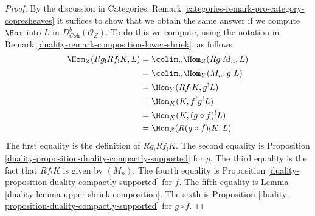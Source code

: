 \begin{proof}

By the discussion in
Categories, Remark \ref{categories-remark-pro-category-copresheaves}
it suffices to show that we obtain the same answer if we compute
$\Hom$ into $L$ in $D^b_{\textit{Coh}}(\mathcal{O}_Z)$. To do this
we compute, using the notation in
Remark \ref{duality-remark-composition-lower-shriek}, as follows
\begin{align*}
\Hom_Z(Rg_!Rf_!K, L)
& =
\colim_n \Hom_Z(Rg_!M_n, L) \\
& =
\colim_n \Hom_Y(M_n, g^!L) \\
& =
\Hom_Y(Rf_!K, g^!L) \\
& =
\Hom_X(K, f^!g^!L) \\
& =
\Hom_X(K, (g \circ f)^!L) \\
& =
\Hom_Z(R(g \circ f)_!K, L)
\end{align*}
The first equality is the definition of $Rg_!Rf_!K$. The second
equality is Proposition \ref{duality-proposition-duality-compactly-supported}
for $g$.
The third equality is the fact that $Rf_!K$ is given by $(M_n)$.
The fourth equality is
Proposition \ref{duality-proposition-duality-compactly-supported} for $f$.
The fifth equality is Lemma \ref{duality-lemma-upper-shriek-composition}.
The sixth is
Proposition \ref{duality-proposition-duality-compactly-supported} for $g \circ f$.
\end{proof}

